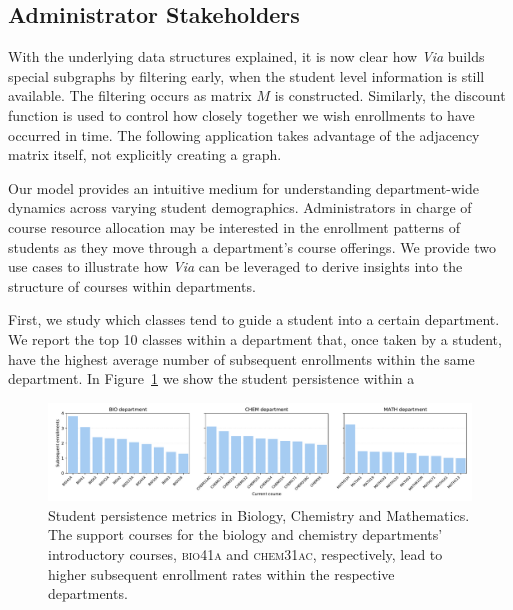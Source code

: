 \subsection{Administrator Stakeholders}
\label{sec:administrative_stakeholders}

With the underlying data structures explained, it is now clear how
{\em Via} builds special subgraphs by filtering early, when the
student level information is still available. The filtering occurs as
matrix $M$ is constructed. Similarly, the discount function is used to
control how closely together we wish enrollments to have occurred in
time. The following application takes advantage of the adjacency
matrix itself, not explicitly creating a graph.

Our model provides an intuitive medium for understanding
department-wide dynamics across varying student
demographics. Administrators in charge of course resource allocation
may be interested in the enrollment patterns of students as they move
through a department's course offerings. We provide two use cases to
illustrate how \textit{Via} can be leveraged to derive insights into
the structure of courses within departments.

First, we study which classes tend to guide a student into a certain
department. We report the top 10 classes within a department that,
once taken by a student, have the highest average number of subsequent
enrollments within the same department. In
Figure~\ref{fig:persistence} we show the student persistence within a

\begin{figure}[h!]
    \centering
    \includegraphics[width=18cm]{Figs/final-persistence.pdf}
    \caption{Student persistence metrics in Biology, Chemistry and
      Mathematics. The support courses for the biology and chemistry
      departments' introductory courses, \textsc{bio41a} and \textsc{chem31ac},
      respectively, lead to higher subsequent enrollment rates within
      the respective departments.}
    \label{fig:persistence}
\end{figure}

